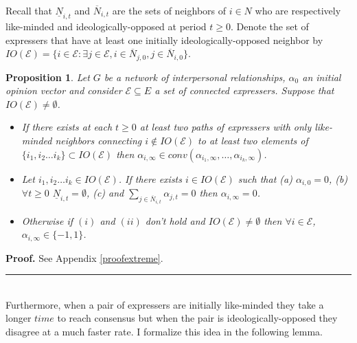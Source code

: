 \documentclass{article}
\newtheorem{proposition}{Proposition}
\newenvironment{proof}[1][Proof]{\textbf{#1.} }{\ \rule{0.5em}{0.5em}}
\begin{document}
Recall that $\underline{N}_{i,t}$ and $\overline{N}_{i,t}$ are the sets of neighbors of $i \in N$ who are respectively  like-minded and ideologically-opposed at period $t \geq 0$. Denote the set of expressers that have at least one initially ideologically-opposed neighbor by $IO(\mathcal{E}) =\{  i \in \mathcal{E} :   \exists j \in \mathcal{E}, i \in \overline{N}_{j,0}  , j \in \overline{N}_{i,0}   \}$. 

\begin{proposition} Let $G$ be a network of interpersonal relationships, $\alpha_{0}$ an initial opinion vector and consider $\mathcal{E} \subseteq E$ a set of connected expressers. Suppose that $IO(\mathcal{E}) \neq \emptyset $.
 \begin{itemize} \item[(i)] If there exists at each $t \geq 0$ at least two paths of expressers with only like-minded neighbors connecting $i \not \in IO(\mathcal{E})$ to at least two elements of $\{ i_1, i_2 \ldots i_k \} \subset IO(\mathcal{E})$ then $\alpha_{i,\infty} \in {conv}{(\alpha_{i_1,\infty} , \ldots , \alpha_{i_k,\infty} )}$. 

 \item[(ii)]  Let $i_1, i_2 \ldots i_k \in IO(\mathcal{E})$. If there exists $i  \in IO(\mathcal{E})$ such that (a) $\alpha_{i,0}=0$, (b)  $\forall t \geq 0$ $\underline{N}_{i,t} = \emptyset$, (c) and $\sum_{j \in \overline{N}_{i,t}} \alpha_{j,t}=0$ then $\alpha_{i,\infty}=0$.
 
 \item[(iii)] Otherwise if $(i)$ and $(ii)$ don't hold and $IO(\mathcal{E}) \neq \emptyset$ then $\forall i \in \mathcal{E}$, $\alpha_{i,\infty} \in \{ -1,1\}$. \end{itemize}
\label{extreme}
\end{proposition}
   
\noindent \begin{proof} See Appendix \ref{proofextreme}.  \end{proof} \\

Furthermore, when a pair of expressers are initially like-minded they take a longer $time$ to reach consensus but when the pair is ideologically-opposed they disagree at a much faster rate. I formalize this idea in the following lemma. 
\end{document}

